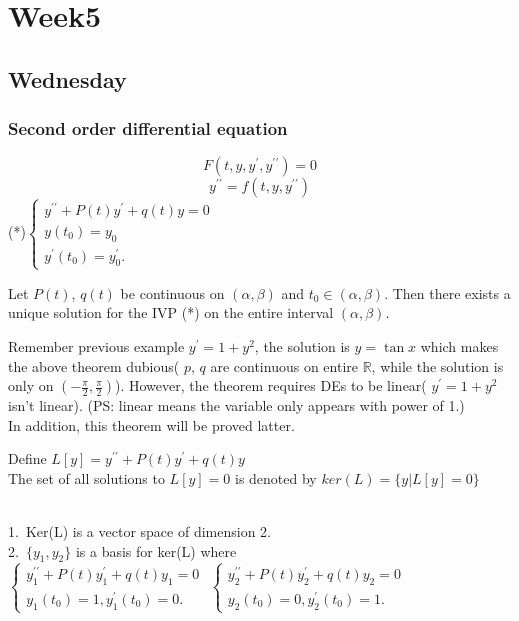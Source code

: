 \chapter{Week5}

\section{Wednesday}
\subsection{Second order differential equation}
\[F(t,y,y^\prime,y^{\prime\prime})=0
\]
\[y^{\prime\prime}=f(t,y,y^{\prime\prime})
\]
 (*)$\left \{	\begin{gathered}
y^{\prime\prime}+P(t)y^\prime+q(t)y=0	\\
y(t_0)=y_0\\
y^\prime(t_0)=y_0^\prime.
\end{gathered}\right.$ 
\begin{theorem}
Let $P(t)$, $q(t)$ be continuous on $(\alpha,\beta)$ and $t_0\in(\alpha,\beta)$. Then there exists a unique solution for the IVP (*) on the entire interval $(\alpha,\beta)$.
\end{theorem}
\begin{remark}
Remember previous example $y^\prime=1+y^2$, the solution is $y=\tan x$ which makes the above theorem dubious( $p$, $q$ are continuous on entire $\mathbb{R}$, while the solution is only on $(-\frac{\pi}{2},\frac{\pi}{2})$). However, the theorem requires DEs to be linear( $y^\prime=1+y^2$ isn't linear). (PS: linear means the variable only appears with power of 1.)\\
In addition, this theorem will be proved latter.
\end{remark}
\begin{definition}
Define $L[y]=y^{\prime\prime}+P(t)y^\prime+q(t)y$\\ 
The set of all solutions to $L[y]=0$ is denoted by $ker(L)=\{y|L[y]=0\}$

\end{definition}
\begin{proposition}
\quad\\
1.~Ker(L) is a vector space of dimension 2.\\
2.~$\{y_1,y_2\}$ is a basis for ker(L) where\\
 $\left \{	\begin{gathered}
y_1^{\prime\prime}+P(t)y_1^\prime+q(t)y_1=0	\\
y_1(t_0)=1, y_1^\prime(t_0)=0.
\end{gathered}\right.$ \qquad
$\left \{	\begin{gathered}
y_2^{\prime\prime}+P(t)y_2^\prime+q(t)y_2=0	\\
y_2(t_0)=0, y_2^\prime(t_0)=1.
\end{gathered}\right.$ 
\end{proposition}

